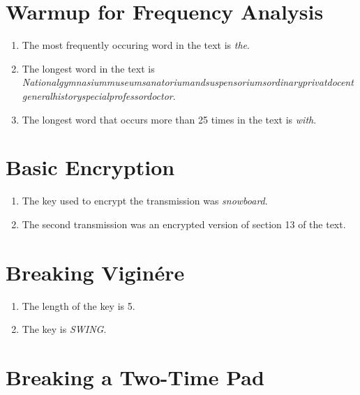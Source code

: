 \documentclass{article}
\begin{document}
\section{Warmup for Frequency Analysis}
\begin{enumerate}
    \item The most frequently occuring word in the text is \textit{the}.
    \item The longest word in the text is \textit{Nationalgymnasiummuseumsanatoriumandsuspensoriumsordinaryprivatdocentgeneralhistoryspecialprofessordoctor}.
    \item The longest word that occurs more than 25 times in the text is \textit{with}.
\end{enumerate}

\section{Basic Encryption}
\begin{enumerate}
    \item The key used to encrypt the transmission was \textit{snowboard}.
    \item The second transmission was an encrypted version of section 13 of the text.
\end{enumerate}

\section{Breaking Vigin\'{e}re}

\begin{enumerate}
    \item The length of the key is 5.
    \item The key is \textit{SWING}.
\end{enumerate}

\section{Breaking a Two-Time Pad}
\end{document}
